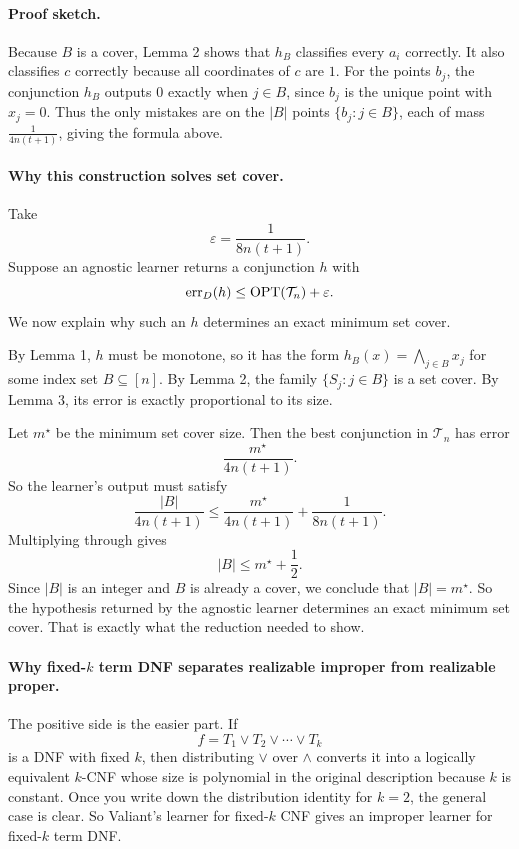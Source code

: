 \paragraph{Proof sketch.}
Because $B$ is a cover, Lemma 2 shows that $h_B$ classifies every $a_i$ correctly. It also classifies $c$ correctly because all coordinates of $c$ are $1$. For the points $b_j$, the conjunction $h_B$ outputs $0$ exactly when $j \in B$, since $b_j$ is the unique point with $x_j=0$. Thus the only mistakes are on the $|B|$ points $\{b_j : j \in B\}$, each of mass $\frac{1}{4n(t+1)}$, giving the formula above.

\paragraph{Why this construction solves set cover.}
Take
\[
\varepsilon=\frac{1}{8n(t+1)}.
\]
Suppose an agnostic learner returns a conjunction $h$ with
\[
\operatorname{err}_D(h)\le \operatorname{OPT}(\mathcal{T}_n)+\varepsilon.
\]
We now explain why such an $h$ determines an exact minimum set cover.

By Lemma 1, $h$ must be monotone, so it has the form $h_B(x)=\bigwedge_{j\in B}x_j$ for some index set $B \subseteq [n]$. By Lemma 2, the family $\{S_j : j \in B\}$ is a set cover. By Lemma 3, its error is exactly proportional to its size.

Let $m^\star$ be the minimum set cover size. Then the best conjunction in $\mathcal{T}_n$ has error
\[
\frac{m^\star}{4n(t+1)}.
\]
So the learner's output must satisfy
\[
\frac{|B|}{4n(t+1)}
\le
\frac{m^\star}{4n(t+1)}+\frac{1}{8n(t+1)}.
\]
Multiplying through gives
\[
|B|\le m^\star+\frac12.
\]
Since $|B|$ is an integer and $B$ is already a cover, we conclude that $|B|=m^\star$. So the hypothesis returned by the agnostic learner determines an exact minimum set cover. That is exactly what the reduction needed to show.

\paragraph{Why fixed-$k$ term DNF separates realizable improper from realizable proper.}
The positive side is the easier part. If
\[
f = T_1 \vee T_2 \vee \cdots \vee T_k
\]
is a DNF with fixed $k$, then distributing $\vee$ over $\wedge$ converts it into a logically equivalent $k$-CNF whose size is polynomial in the original description because $k$ is constant. Once you write down the distribution identity for $k=2$, the general case is clear. So Valiant's learner for fixed-$k$ CNF gives an improper learner for fixed-$k$ term DNF.

